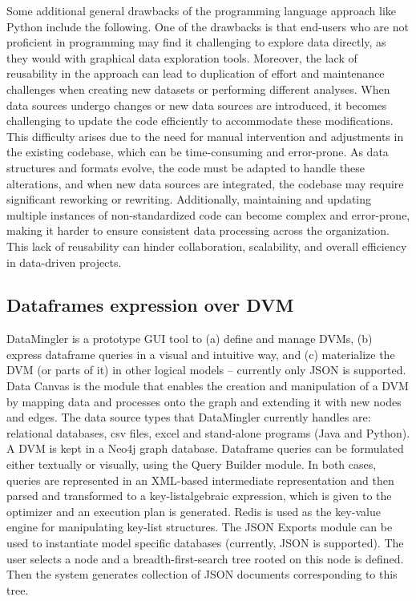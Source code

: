 Some additional general drawbacks of the programming language approach like Python include the following. One of the drawbacks is that end-users who are not proficient in programming may find it challenging to explore data directly, as they would with graphical data exploration tools. Moreover, the lack of reusability in the approach can lead to duplication of effort and maintenance challenges when creating new datasets or performing different analyses. When data sources undergo changes or new data sources are introduced, it becomes challenging to update the code efficiently to accommodate these modifications. This difficulty arises due to the need for manual intervention and adjustments in the existing codebase, which can be time-consuming and error-prone. As data structures and formats evolve, the code must be adapted to handle these alterations, and when new data sources are integrated, the codebase may require significant reworking or rewriting. Additionally, maintaining and updating multiple instances of non-standardized code can become complex and error-prone, making it harder to ensure consistent data processing across the organization. This lack of reusability can hinder collaboration, scalability, and overall efficiency in data-driven projects. 

\subsection{Dataframes expression over DVM} %

DataMingler is a prototype GUI tool to (a) define and manage DVMs, (b) express dataframe queries in a visual and intuitive way, and (c) materialize the DVM (or parts of it) in other logical models – currently only JSON is supported. Data Canvas is the module that enables the creation and manipulation of a DVM by mapping data and processes onto the graph and extending it with new nodes and edges. The data source types that DataMingler currently handles are: relational databases, csv files, excel and stand-alone programs (Java and Python). A DVM is kept in a Neo4j graph database. Dataframe queries can be formulated either textually or visually, using the Query Builder module. In both cases, queries are represented in an XML-based intermediate representation and then parsed and transformed to a key-listalgebraic expression, which is given to the optimizer and an execution plan is generated. Redis is used as the key-value engine for manipulating key-list structures. The JSON Exports module can be used to instantiate model specific databases (currently, JSON is supported). The user selects a node and a breadth-first-search tree rooted on this node is defined. Then the system generates collection of JSON documents corresponding to this tree\cite{chatziantoniou}.

